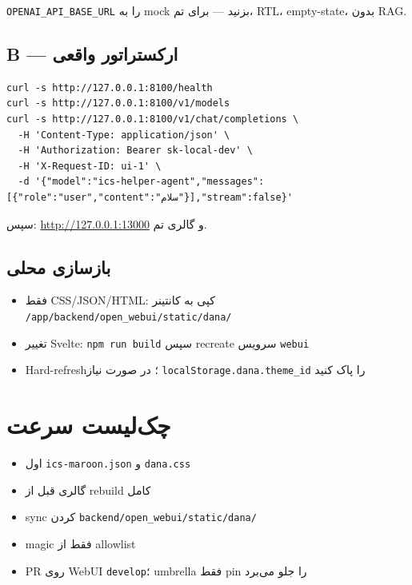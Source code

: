 \documentclass[11pt,a4paper]{article}
\begin{document}
\textenglish{\texttt{OPENAI\_API\_BASE\_URL}} را به mock بزنید --- برای تم،
\textenglish{RTL}، \textenglish{empty-state}، بدون \textenglish{RAG}.

\subsection{\textenglish{B} --- ارکستراتور واقعی}

\begin{english}
\begin{lstlisting}
curl -s http://127.0.0.1:8100/health
curl -s http://127.0.0.1:8100/v1/models
curl -s http://127.0.0.1:8100/v1/chat/completions \
  -H 'Content-Type: application/json' \
  -H 'Authorization: Bearer sk-local-dev' \
  -H 'X-Request-ID: ui-1' \
  -d '{"model":"ics-helper-agent","messages":[{"role":"user","content":"سلام"}],"stream":false}'
\end{lstlisting}
\end{english}

سپس: \url{http://127.0.0.1:13000} و گالری تم.

\subsection{بازسازی محلی}

\begin{itemize}
  \item فقط \textenglish{CSS/JSON/HTML}: کپی به کانتینر
    \textenglish{\texttt{/app/backend/open\_webui/static/dana/}}
  \item تغییر \textenglish{Svelte}: \textenglish{\texttt{npm run build}} سپس recreate سرویس
    \textenglish{\texttt{webui}}
  \item \textenglish{Hard-refresh}؛ در صورت نیاز
    \textenglish{\texttt{localStorage.dana.theme\_id}} را پاک کنید
\end{itemize}

\section{چک‌لیست سرعت}

\begin{itemize}
  \item اول \textenglish{\texttt{ics-maroon.json}} و \textenglish{\texttt{dana.css}}
  \item گالری قبل از rebuild کامل
  \item sync کردن \textenglish{\texttt{backend/open\_webui/static/dana/}}
  \item \textenglish{magic} فقط از \textenglish{allowlist}
  \item \textenglish{PR} روی \textenglish{WebUI \texttt{develop}}؛ umbrella فقط pin را جلو می‌برد
\end{itemize}
\end{document}
